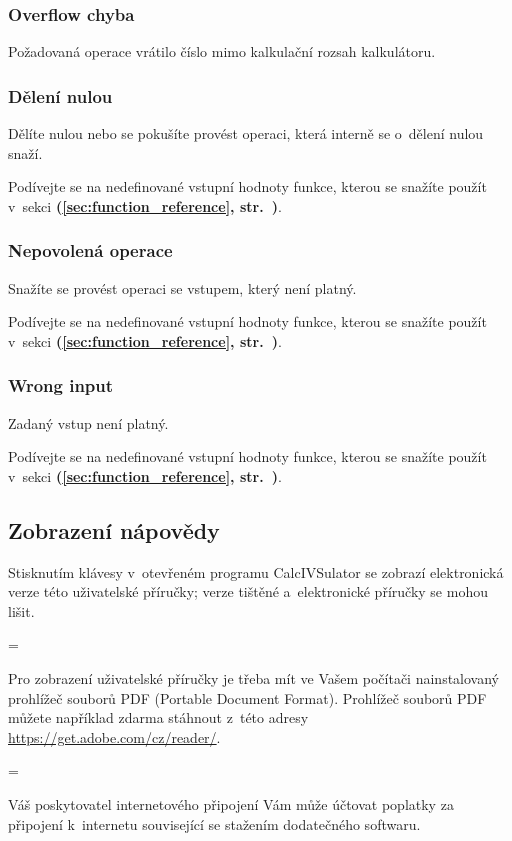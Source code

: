 \documentclass[a5paper,8pt,twoside]{extarticle}
\newcommand*{\appname}{CalcIVSulator}
\newenvironment{warningBox}
  {\par\begin{mdframed}[linewidth=1pt,linecolor=black]%
    \begin{list}{}{\leftmargin=1cm
                   \labelwidth=\leftmargin}\item[\Large\warning]}
  {\end{list}\end{mdframed}\par}
\newenvironment{infoBox}
  {\par\begin{mdframed}[linewidth=1pt,linecolor=black]%
    \begin{list}{}{\leftmargin=1cm
                   \labelwidth=\leftmargin}\item[\Large\lefthand]}
  {\end{list}\end{mdframed}\par}
\newcommand*\nref[1]{\textbf{(\ref{#1}, str.~\pageref{#1})}}
\begin{document}
    \subsubsection{Overflow chyba}
    Požadovaná operace vrátilo číslo mimo kalkulační rozsah kalkulátoru.

    \subsubsection{Dělení nulou}
    Dělíte nulou nebo se pokušíte provést operaci, která interně se o~dělení nulou snaží.

    Podívejte se na nedefinované vstupní hodnoty funkce, kterou se snažíte použít v~sekci  \nref{sec:function_reference}.

    \subsubsection{Nepovolená operace}
    Snažíte se provést operaci se vstupem, který není platný.
    
    Podívejte se na nedefinované vstupní hodnoty funkce, kterou se snažíte použít v~sekci  \nref{sec:function_reference}.

    \subsubsection{Wrong input}
    Zadaný vstup není platný.

    Podívejte se na nedefinované vstupní hodnoty funkce, kterou se snažíte použít v~sekci  \nref{sec:function_reference}.    

    \subsection{Zobrazení nápovědy}
    Stisknutím klávesy  v~otevřeném programu \appname{} se zobrazí elektronická verze této uživatelské příručky; verze tištěné a~elektronické příručky se mohou lišit.

    \begin{infoBox}
        Pro zobrazení uživatelské příručky je třeba mít ve Vašem počítači nainstalovaný prohlížeč souborů PDF (Portable Document Format). Prohlížeč souborů PDF můžete například zdarma stáhnout z~této adresy \url{https://get.adobe.com/cz/reader/}.
        \begin{warningBox}
            Váš poskytovatel internetového připojení Vám může účtovat poplatky za připojení k~internetu související se stažením dodatečného softwaru.
        \end{warningBox}
    \end{infoBox}
\end{document}
